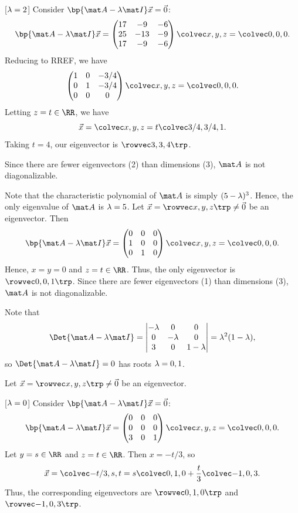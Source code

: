 \begin{solution}
\begin{ppart}
        [$\lambda = 2$] Consider $\bp{\mat A - \l \mat I} \vec x = \vec 0$: \[\bp{\mat A - \l \mat I} \vec x = \begin{pmatrix}17 & -9 & -6 \\ 25 & -13 & -9 \\ 17 & -9 & -6\end{pmatrix} \cveciii{x}{y}{z} = \cveciii000.\] Reducing to RREF, we have \[\begin{pmatrix}1 & 0 & -3/4 \\ 0 & 1 & -3/4 \\ 0 & 0 & 0\end{pmatrix} \cveciii{x}{y}{z} = \cveciii000.\] Letting $z = t \in \RR$, we have \[\vec x = \cveciii{x}{y}{z} = t\cveciii{3/4}{3/4}{1}.\] Taking $t = 4$, our eigenvector is $\cveciiix334$.

        Since there are fewer eigenvectors (2) than dimensions (3), $\mat A$ is not diagonalizable.
    \end{ppart}
    \begin{ppart}
        Note that the characteristic polynomial of $\mat A$ is simply $(5-\lambda)^3$. Hence, the only eigenvalue of $\mat A$ is $\lambda = 5$. Let $\vec x = \cveciiix{x}{y}{z} \neq \vec 0$ be an eigenvector. Then \[\bp{\mat A - \l \mat I} \vec x = \begin{pmatrix}0 & 0 & 0 \\ 1 & 0 & 0 \\ 0 & 1 & 0\end{pmatrix} \cveciii{x}{y}{z} = \cveciii000.\] Hence, $x = y = 0$ and $z = t \in \RR$. Thus, the only eigenvector is $\cveciiix001$. Since there are fewer eigenvectors (1) than dimensions (3), $\mat A$ is not diagonalizable.
    \end{ppart}
    \begin{ppart}
        Note that \[\Det{\mat A - \l \mat I} = \begin{vmatrix}-\l & 0 & 0 \\ 0 & -\l & 0 \\ 3 & 0 & 1 - \l\end{vmatrix} = \l^2 (1-\l),\] so $\Det{\mat A - \l \mat I} = 0$ has roots $\lambda = 0, 1$.

        Let $\vec x = \cveciiix{x}{y}{z} \neq \vec 0$ be an eigenvector.

        [$\lambda = 0$] Consider $\bp{\mat A - \l \mat I} \vec x = \vec 0$: \[\bp{\mat A - \l \mat I} \vec x = \begin{pmatrix}0 & 0 & 0 \\ 0 & 0 & 0 \\ 3 & 0 & 1\end{pmatrix}\cveciii{x}{y}{z} = \cveciii000.\] Let $y = s \in \RR$ and $z = t \in \RR$. Then $x = -t/3$, so \[\vec x = \cveciii{-t/3}{s}{t} = s \cveciii010 + \frac{t}3 \cveciii{-1}03.\] Thus, the corresponding eigenvectors are $\cveciiix010$ and $\cveciiix{-1}03$.


\end{ppart}
\end{solution}
